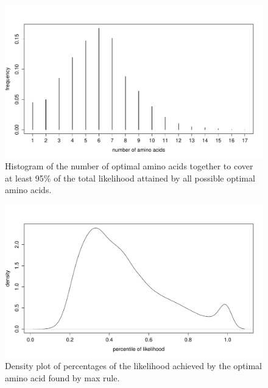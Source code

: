 \begin{figure}[h]
\centering
\includegraphics[width=\textwidth]{AAnum.pdf}
\caption{Histogram of the number of optimal amino acids together to cover at least 95\% of the total likelihood attained by all possible optimal amino acids.}
\label{fig:AAnum}
\end{figure}


\begin{figure}[h]
\centering
\includegraphics[width=\textwidth]{percentile.pdf}
\caption{Density plot of percentages of the likelihood achieved by the optimal amino acid found by max rule.}
\label{fig:percentile}
\end{figure}



